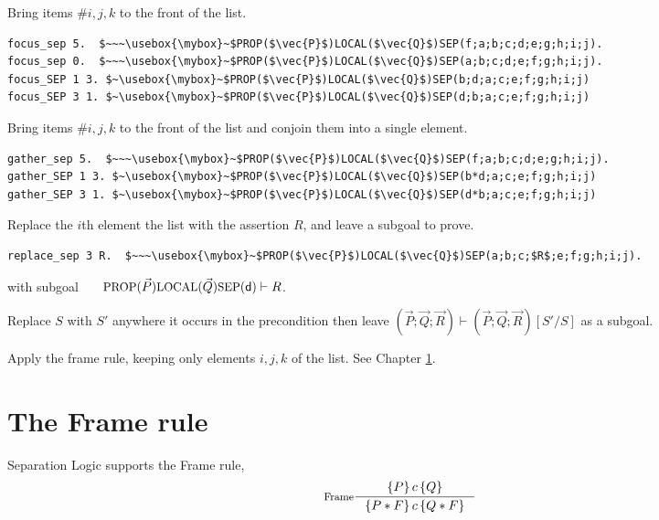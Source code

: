 \documentclass[12pt,fleqn,openany,oneside,showtrims]{memoir}
\newcommand{\ychapter}[2]{\chapter[#1]{#1 \hfill \normalsize #2}}
\begin{document}
\begin{description}\setlength{\itemsep}{2ex}
\item[$\mathsf{focus\_SEP}~i~j~k$.]
Bring items \#$i,j,k$ to the front of the \SEP{} list.
\begin{lstlisting}
focus_sep 5.  $~~~\usebox{\mybox}~$PROP($\vec{P}$)LOCAL($\vec{Q}$)SEP(f;a;b;c;d;e;g;h;i;j).
focus_sep 0.  $~~~\usebox{\mybox}~$PROP($\vec{P}$)LOCAL($\vec{Q}$)SEP(a;b;c;d;e;f;g;h;i;j).
focus_SEP 1 3. $~\usebox{\mybox}~$PROP($\vec{P}$)LOCAL($\vec{Q}$)SEP(b;d;a;c;e;f;g;h;i;j)
focus_SEP 3 1. $~\usebox{\mybox}~$PROP($\vec{P}$)LOCAL($\vec{Q}$)SEP(d;b;a;c;e;f;g;h;i;j)
\end{lstlisting}
\item[$\mathsf{gather\_SEP}~i~j~k$.]
Bring items \#$i,j,k$ to the front of the \SEP{} list
and conjoin them into a single element.
\begin{lstlisting}
gather_sep 5.  $~~~\usebox{\mybox}~$PROP($\vec{P}$)LOCAL($\vec{Q}$)SEP(f;a;b;c;d;e;g;h;i;j).
gather_SEP 1 3. $~\usebox{\mybox}~$PROP($\vec{P}$)LOCAL($\vec{Q}$)SEP(b*d;a;c;e;f;g;h;i;j)
gather_SEP 3 1. $~\usebox{\mybox}~$PROP($\vec{P}$)LOCAL($\vec{Q}$)SEP(d*b;a;c;e;f;g;h;i;j)
\end{lstlisting}
\item[$\mathsf{replace\_SEP}~i~R$.]
Replace the $i$th element the \SEP{} list
with the assertion $R$, and leave a subgoal to prove.
\begin{lstlisting}
replace_sep 3 R.  $~~~\usebox{\mybox}~$PROP($\vec{P}$)LOCAL($\vec{Q}$)SEP(a;b;c;$R$;e;f;g;h;i;j).
\end{lstlisting}
with subgoal~~~ $\mbox{\small PROP}(\vec{P})\mbox{\small LOCAL}(\vec{Q})\mbox{\small SEP}(\textsf{d}) \vdash R$.
\item[$\mathsf{replace\_in\_pre}~S~S'$.]
Replace $S$ with $S'$ anywhere it occurs in the precondition
then leave
$(\vec{P};\vec{Q};\vec{R}) \vdash (\vec{P};\vec{Q};\vec{R})[S'/S]$
as a subgoal.
\item[$\mathsf{frame\_SEP}~i~j~k.$]
Apply the frame rule, keeping only
elements $i,j,k$ of the \SEP{} list.  See Chapter \ref{refcard:frame}.
\end{description}

\ychapter{The Frame rule}{}
\label{refcard:frame}

Separation Logic supports the Frame rule,
\[\inference[Frame]{\triple{P}{c}{Q}}{\triple{P*F}{c}{Q*F}}\]
\end{document}
